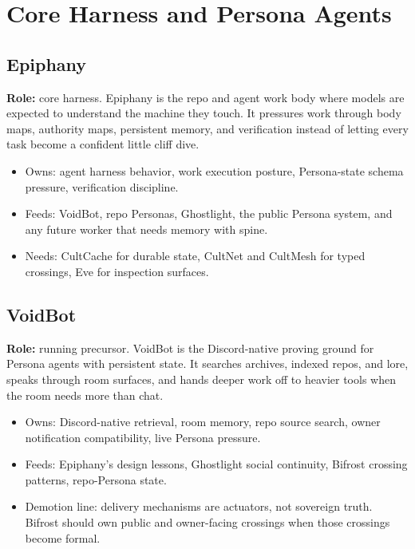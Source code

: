 \documentclass[11pt,oneside]{article}
\newcommand{\Signal}[1]{\textbf{\color{cultblue}#1}}
\begin{document}
\section{Core Harness and Persona Agents}

\subsection{Epiphany}

\Signal{Role:} core harness. Epiphany is the repo and agent work body where
models are expected to understand the machine they touch. It pressures work
through body maps, authority maps, persistent memory, and verification instead
of letting every task become a confident little cliff dive.

\begin{itemize}
  \item Owns: agent harness behavior, work execution posture, Persona-state schema pressure, verification discipline.
  \item Feeds: VoidBot, repo Personas, Ghostlight, the public Persona system, and any future worker that needs memory with spine.
  \item Needs: CultCache for durable state, CultNet and CultMesh for typed crossings, Eve for inspection surfaces.
\end{itemize}

\subsection{VoidBot}

\Signal{Role:} running precursor. VoidBot is the Discord-native proving ground
for Persona agents with persistent state. It searches archives, indexed repos,
and lore, speaks through room surfaces, and hands deeper work off to heavier
tools when the room needs more than chat.

\begin{itemize}
  \item Owns: Discord-native retrieval, room memory, repo source search, owner notification compatibility, live Persona pressure.
  \item Feeds: Epiphany's design lessons, Ghostlight social continuity, Bifrost crossing patterns, repo-Persona state.
  \item Demotion line: delivery mechanisms are actuators, not sovereign truth. Bifrost should own public and owner-facing crossings when those crossings become formal.
\end{itemize}
\end{document}
